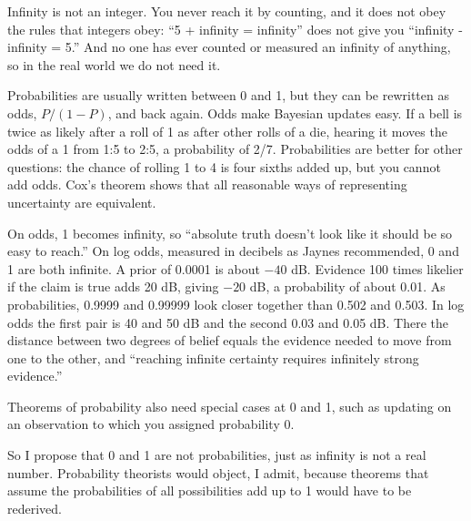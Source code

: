 
Infinity is not an integer. You never reach it by counting, and it does not obey the rules that integers obey: ``5 + infinity = infinity'' does not give you ``infinity - infinity = 5.'' And no one has ever counted or measured an infinity of anything, so in the real world we do not need it.

Probabilities are usually written between 0 and 1, but they can be rewritten as odds, $P/(1-P)$, and back again. Odds make Bayesian updates easy. If a bell is twice as likely after a roll of 1 as after other rolls of a die, hearing it moves the odds of a 1 from 1:5 to 2:5, a probability of 2/7. Probabilities are better for other questions: the chance of rolling 1 to 4 is four sixths added up, but you cannot add odds. Cox's theorem shows that all reasonable ways of representing uncertainty are equivalent. 

On odds, 1 becomes infinity, so ``absolute truth doesn't look like it should be so easy to reach.''  On log odds, measured in decibels as Jaynes recommended, 0 and 1 are both infinite. A prior of 0.0001 is about $-40$ dB. Evidence 100 times likelier if the claim is true adds 20 dB, giving $-20$ dB, a probability of about 0.01. As probabilities, 0.9999 and 0.99999 look closer together than 0.502 and 0.503. In log odds the first pair is 40 and 50 dB and the second 0.03 and 0.05 dB. There the distance between two degrees of belief equals the evidence needed to move from one to the other, and ``reaching infinite certainty requires infinitely strong evidence.'' 

Theorems of probability also need special cases at 0 and 1, such as updating on an observation to which you assigned probability 0. 

So I propose that 0 and 1 are not probabilities, just as infinity is not a real number.  Probability theorists would object, I admit, because theorems that assume the probabilities of all possibilities add up to 1 would have to be rederived. 

